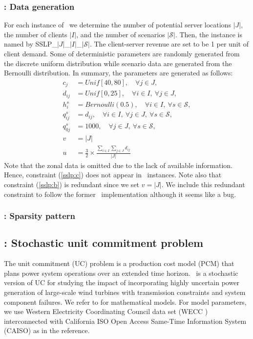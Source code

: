 \subsubsection{\sslp: Data generation}
For each instance of \sslp\, we determine the number of potential server locations $|J|$, the number of clients $|I|$, and the number of scenarios $|\mathcal{S}|$. Then, the instance is named by SSLP\_$|J|$\_$|I|$\_$|\mathcal{S}|$. The client-server revenue are set to be 1 per unit of client demand. Some of deterministic parameters are randomly generated from the discrete uniform distribution while scenario data are generated from the Bernoulli distribution. In summary, the parameters are generated as follows:
\begin{align*}
c_j	&=Unif[40,80],\quad\forall j\in J,\\
d_{ij}	&= Unif[0,25],\quad\forall i\in I,\ \forall j\in J,\\
h_i^s	&= Bernoulli(0.5),\quad\forall i\in I,\ \forall s\in \mathcal{S},\\
q_{ij}^s	&= d_{ij},\quad\forall i\in I,\ \forall j\in J,\ \forall s\in\mathcal{S},\\
q_{0j}^s	&=	1000,\quad\forall j\in J,\ \forall s\in\mathcal{S},\\
v 		&= |J|	\\
u	&= \frac{3}{2}\times\frac{\sum_{i\in I}\sum_{j\in J}d_{ij}}{|J|} 
\end{align*}
Note that the zonal data is omitted due to the lack of available information. Hence, constraint (\ref{sslp:c}) does not appear in \siplibtwo\ instances. Note also that constraint (\ref{sslp:b}) is redundant since we set $v=|J|$. We include this redundant constraint to follow the former \siplib\ implementation although it seems like a bug.

\subsubsection{\sslp: Sparsity pattern}

\subsection{\suc: Stochastic unit commitment problem} \label{SUC}
The unit commitment (UC) problem is a production cost model (PCM) that plans power system operations over an extended time horizon. \suc\ is a stochastic version of UC for studying the impact of incorporating highly uncertain power generation of large-scale wind turbines with transmission constraints and system component failures. We refer to \cite{journal:PO2013} for mathematical models. For model parameters, we use Western Electricity Coordinating Council data set (WECC \cite{wecc}) interconnected with California ISO Open Access Same-Time Information System (CAISO) as in the reference. 
